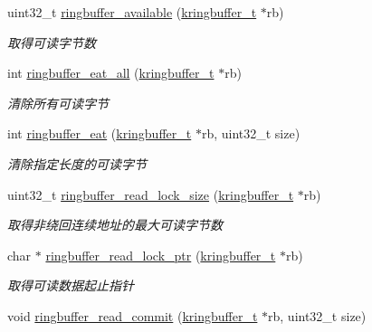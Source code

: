 \begin{DoxyCompactItemize}
uint32\+\_\+t \hyperlink{a00092_aecd5c166ce42982ee434172cc555787d_aecd5c166ce42982ee434172cc555787d}{ringbuffer\+\_\+available} (\hyperlink{a00056_a66d91f7667db1f0b2983fc25e1a20f1c_a66d91f7667db1f0b2983fc25e1a20f1c}{kringbuffer\+\_\+t} $\ast$rb)
\begin{DoxyCompactList}\small\item\em 取得可读字节数 \end{DoxyCompactList}\item 
int \hyperlink{a00092_ab74775801f1ad149ac0beb37336f92e3_ab74775801f1ad149ac0beb37336f92e3}{ringbuffer\+\_\+eat\+\_\+all} (\hyperlink{a00056_a66d91f7667db1f0b2983fc25e1a20f1c_a66d91f7667db1f0b2983fc25e1a20f1c}{kringbuffer\+\_\+t} $\ast$rb)
\begin{DoxyCompactList}\small\item\em 清除所有可读字节 \end{DoxyCompactList}\item 
int \hyperlink{a00092_a1ee13a66a33b0d5648d7c95b48bd6536_a1ee13a66a33b0d5648d7c95b48bd6536}{ringbuffer\+\_\+eat} (\hyperlink{a00056_a66d91f7667db1f0b2983fc25e1a20f1c_a66d91f7667db1f0b2983fc25e1a20f1c}{kringbuffer\+\_\+t} $\ast$rb, uint32\+\_\+t size)
\begin{DoxyCompactList}\small\item\em 清除指定长度的可读字节 \end{DoxyCompactList}\item 
uint32\+\_\+t \hyperlink{a00092_a4bd33ec2ce3cba490a6166c5eac88f5c_a4bd33ec2ce3cba490a6166c5eac88f5c}{ringbuffer\+\_\+read\+\_\+lock\+\_\+size} (\hyperlink{a00056_a66d91f7667db1f0b2983fc25e1a20f1c_a66d91f7667db1f0b2983fc25e1a20f1c}{kringbuffer\+\_\+t} $\ast$rb)
\begin{DoxyCompactList}\small\item\em 取得非绕回连续地址的最大可读字节数 \end{DoxyCompactList}\item 
char $\ast$ \hyperlink{a00092_a51fd16b89396cbe6a3e4cf3d41b4dda5_a51fd16b89396cbe6a3e4cf3d41b4dda5}{ringbuffer\+\_\+read\+\_\+lock\+\_\+ptr} (\hyperlink{a00056_a66d91f7667db1f0b2983fc25e1a20f1c_a66d91f7667db1f0b2983fc25e1a20f1c}{kringbuffer\+\_\+t} $\ast$rb)
\begin{DoxyCompactList}\small\item\em 取得可读数据起止指针 \end{DoxyCompactList}\item 
void \hyperlink{a00092_a5d0caeccb61acafaa4c5148b697dd927_a5d0caeccb61acafaa4c5148b697dd927}{ringbuffer\+\_\+read\+\_\+commit} (\hyperlink{a00056_a66d91f7667db1f0b2983fc25e1a20f1c_a66d91f7667db1f0b2983fc25e1a20f1c}{kringbuffer\+\_\+t} $\ast$rb, uint32\+\_\+t size)

\end{DoxyCompactItemize}

